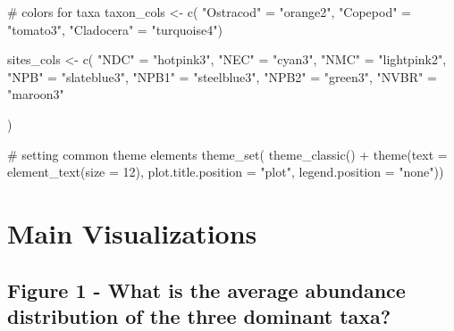 \documentclass[
  letterpaper,
  DIV=11,
  numbers=noendperiod]{scrartcl}
\newenvironment{Shaded}{\begin{snugshade}}{\end{snugshade}}
\newcommand{\AttributeTok}[1]{\textcolor[rgb]{0.40,0.45,0.13}{#1}}
\newcommand{\CommentTok}[1]{\textcolor[rgb]{0.37,0.37,0.37}{#1}}
\newcommand{\DecValTok}[1]{\textcolor[rgb]{0.68,0.00,0.00}{#1}}
\newcommand{\FunctionTok}[1]{\textcolor[rgb]{0.28,0.35,0.67}{#1}}
\newcommand{\NormalTok}[1]{\textcolor[rgb]{0.00,0.23,0.31}{#1}}
\newcommand{\OtherTok}[1]{\textcolor[rgb]{0.00,0.23,0.31}{#1}}
\newcommand{\SpecialCharTok}[1]{\textcolor[rgb]{0.37,0.37,0.37}{#1}}
\newcommand{\StringTok}[1]{\textcolor[rgb]{0.13,0.47,0.30}{#1}}
\newcounter{none} %
\begin{document}
\begin{Shaded}
\begin{Highlighting}[]
\CommentTok{\# colors for taxa}
\NormalTok{taxon\_cols }\OtherTok{\textless{}{-}} \FunctionTok{c}\NormalTok{(}
  \StringTok{"Ostracod"} \OtherTok{=} \StringTok{"orange2"}\NormalTok{,}
  \StringTok{"Copepod"} \OtherTok{=} \StringTok{"tomato3"}\NormalTok{,}
  \StringTok{"Cladocera"} \OtherTok{=} \StringTok{"turquoise4"}\NormalTok{)}

\NormalTok{sites\_cols }\OtherTok{\textless{}{-}} \FunctionTok{c}\NormalTok{(}
  \StringTok{"NDC"} \OtherTok{=} \StringTok{"hotpink3"}\NormalTok{,}
  \StringTok{"NEC"} \OtherTok{=} \StringTok{"cyan3"}\NormalTok{,}
  \StringTok{"NMC"} \OtherTok{=} \StringTok{"lightpink2"}\NormalTok{,}
  \StringTok{"NPB"} \OtherTok{=} \StringTok{"slateblue3"}\NormalTok{,}
  \StringTok{"NPB1"} \OtherTok{=} \StringTok{"steelblue3"}\NormalTok{,}
  \StringTok{"NPB2"} \OtherTok{=} \StringTok{"green3"}\NormalTok{,}
  \StringTok{"NVBR"} \OtherTok{=} \StringTok{"maroon3"}
  
\NormalTok{)}

\CommentTok{\# setting common theme elements}
\FunctionTok{theme\_set}\NormalTok{(}
  \FunctionTok{theme\_classic}\NormalTok{() }\SpecialCharTok{+}
    \FunctionTok{theme}\NormalTok{(}\AttributeTok{text =} \FunctionTok{element\_text}\NormalTok{(}\AttributeTok{size =} \DecValTok{12}\NormalTok{),}
          \AttributeTok{plot.title.position =} \StringTok{"plot"}\NormalTok{,}
          \AttributeTok{legend.position =} \StringTok{"none"}\NormalTok{))}
\end{Highlighting}
\end{Shaded}

\section{Main Visualizations}\label{main-visualizations}

\subsection{Figure 1 - What is the average abundance distribution of the
three dominant
taxa?}\label{figure-1---what-is-the-average-abundance-distribution-of-the-three-dominant-taxa}
\end{document}
